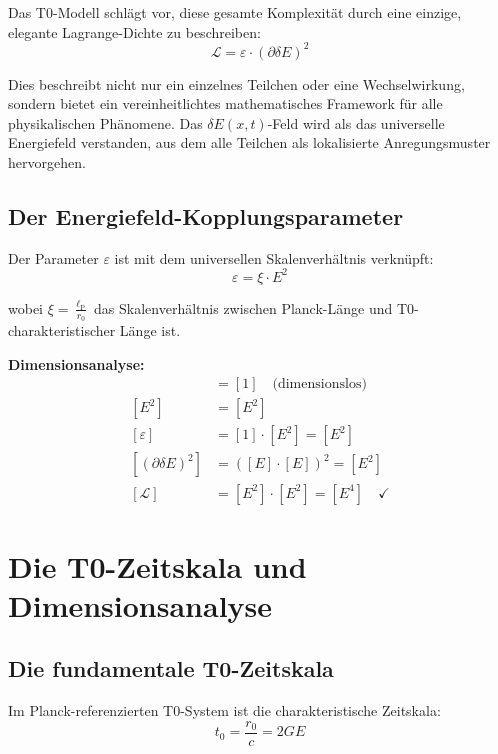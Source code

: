\documentclass[12pt,a4paper]{report}
\newcommand{\lP}{\ell_{\text{P}}}         %
\newcommand{\rzero}{r_0}                  %
\newcommand{\tzero}{t_0}                  %
\begin{document}
	Das T0-Modell schlägt vor, diese gesamte Komplexität durch eine einzige, elegante Lagrange-Dichte zu beschreiben:
	\begin{equation}
		\boxed{\mathcal{L} = \varepsilon \cdot (\partial\delta E)^2}
		\label{eq:universal_lagrangian}
	\end{equation}
	
	Dies beschreibt nicht nur ein einzelnes Teilchen oder eine Wechselwirkung, sondern bietet ein vereinheitlichtes mathematisches Framework für alle physikalischen Phänomene. Das $\delta E(x,t)$-Feld wird als das universelle Energiefeld verstanden, aus dem alle Teilchen als lokalisierte Anregungsmuster hervorgehen.
	
	\subsection{Der Energiefeld-Kopplungsparameter}
	
	Der Parameter $\varepsilon$ ist mit dem universellen Skalenverhältnis verknüpft:
	\begin{equation}
		\varepsilon = \xi \cdot E^2
		\label{eq:energy_coupling}
	\end{equation}
	
	wobei $\xi = \frac{\lP}{\rzero}$ das Skalenverhältnis zwischen Planck-Länge und T0-charakteristischer Länge ist.
	
	\textbf{Dimensionsanalyse:}
	\begin{align}
		[\xi] &= [1] \quad \text{(dimensionslos)} \\
		[E^2] &= [E^2] \\
		[\varepsilon] &= [1] \cdot [E^2] = [E^2] \\
		[(\partial\delta E)^2] &= ([E] \cdot [E])^2 = [E^2] \\
		[\mathcal{L}] &= [E^2] \cdot [E^2] = [E^4] \quad \checkmark
	\end{align}
	
	\section{Die T0-Zeitskala und Dimensionsanalyse}
	
	\subsection{Die fundamentale T0-Zeitskala}
	
	Im Planck-referenzierten T0-System ist die charakteristische Zeitskala:
	\begin{equation}
		\boxed{\tzero = \frac{\rzero}{c} = 2GE}
		\label{eq:t0_time}
	\end{equation}
	
\end{document}
